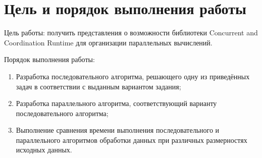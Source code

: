 \documentclass[russian,utf8,pointsection]{eskdtext}
\begin{document}
	\maketitle
	\tableofcontents
	\newpage
	
	\section{Цель и порядок выполнения работы}
	  Цель работы: получить представления о возможности библиотеки Concurrent and Coordination Runtime для организации параллельных вычислений.
	
	Порядок выполнения работы:
	\begin{enumerate}
		\item Разработка последовательного алгоритма, решающего одну из приведённых задач в соответствии с выданным вариантом задания;
		\item Разработка параллельного алгоритма, соответствующий варианту последовательного алгоритма;
		\item Выполнение сравнения времени выполнения последовательного и параллельного алгоритмов обработки данных при различных размерностях исходных данных.
	\end{enumerate}
	\newpage 
	
	
	
\end{document}
